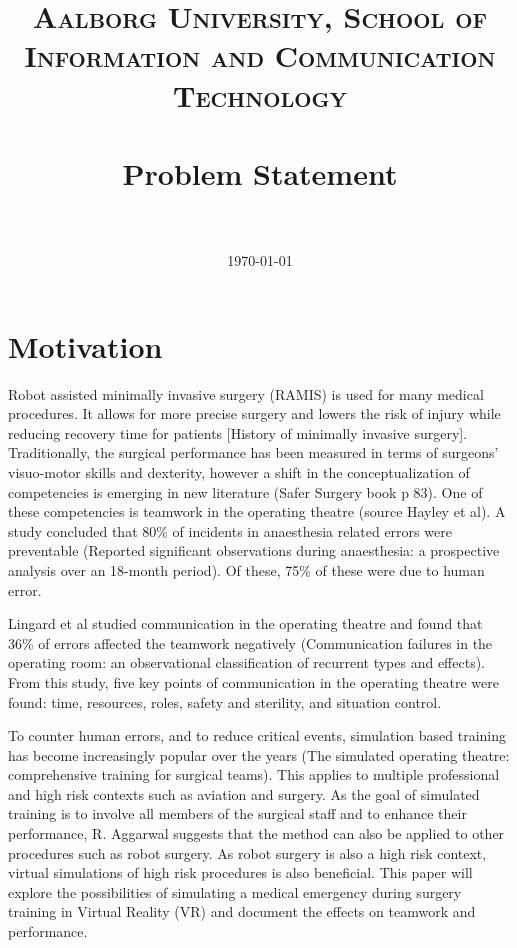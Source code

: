 \documentclass[paper=a4, fontsize=11pt]{scrartcl} %
\title{	
\normalfont \normalsize 
\textsc{Aalborg University, School of Information and Communication Technology} \\ [25pt] %
\horrule{0.5pt} \\[0.4cm] %
\huge Problem Statement \\ %
\horrule{2pt} \\[0.5cm] %
}
\date{\normalsize\today} %
\numberwithin{equation}{section} %
\numberwithin{figure}{section} %
\numberwithin{table}{section} %
\begin{document}
\maketitle %


\section{Motivation}

Robot assisted minimally invasive surgery (RAMIS) is used for many medical procedures. It allows for more precise surgery and lowers the risk of injury while reducing recovery time for patients [History of minimally invasive surgery]. Traditionally, the surgical performance has been measured in terms of surgeons' visuo-motor skills and dexterity, however a shift in the conceptualization of competencies is emerging in new literature (Safer Surgery book p 83). One of these competencies is teamwork in the operating theatre (source Hayley et al). A study concluded that 80\% of incidents in anaesthesia related errors were preventable (Reported significant observations during anaesthesia: a prospective analysis over an 18-month period). Of these, 75\% of these were due to human error. 

Lingard et al studied communication in the operating theatre and found that 36\% of errors affected the teamwork negatively (Communication failures in the operating room: an observational classification of recurrent types and effects). From this study, five key points of communication in the operating theatre were found: time, resources, roles, safety and sterility, and situation control.


To counter human errors, and to reduce critical events, simulation based training has become increasingly popular over the years (The simulated operating theatre: comprehensive training for surgical teams). This applies to multiple professional and high risk contexts such as aviation and surgery. As the goal of simulated training is to involve all members of the surgical staff and to enhance their performance, R. Aggarwal suggests that the method can also be applied to other procedures such as robot surgery. As robot surgery is also a high risk context, virtual simulations of high risk procedures is also beneficial. 
This paper will explore the possibilities of simulating a medical emergency during surgery training in Virtual Reality (VR) and document the effects on teamwork and performance. 
\end{document}
